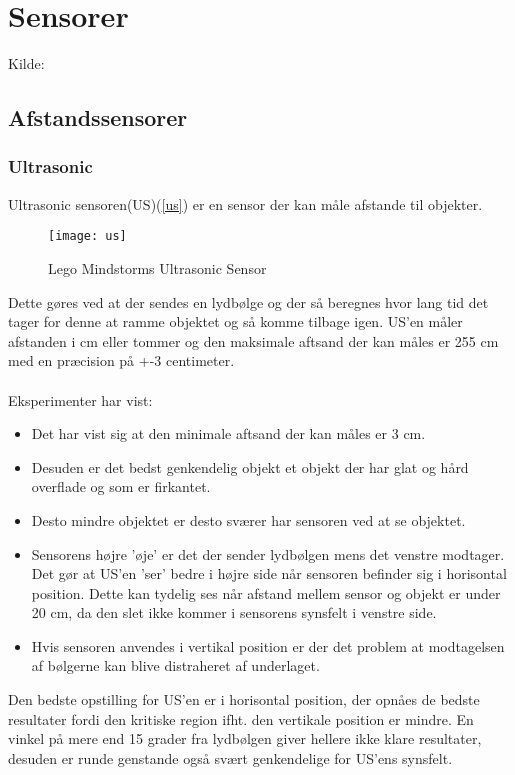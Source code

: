 
\section{Sensorer}
Kilde: \cite{tikNXT}
\subsection{Afstandssensorer}
\subsubsection{Ultrasonic}
Ultrasonic sensoren(US)(\ref{us}) er en sensor der kan måle afstande til objekter.

\begin{figure}[h]
\centering
\texttt{[image: us]}
\caption{Lego Mindstorms Ultrasonic Sensor}
\end{figure}

Dette gøres ved at der sendes en lydbølge og der så beregnes hvor lang tid det tager for denne at ramme objektet og så komme tilbage igen.
US'en måler afstanden i cm eller tommer og den maksimale aftsand der kan måles er 255 cm med en præcision på +-3 centimeter.
\\
\\
Eksperimenter\cite{tikNXT} har vist:
\begin{itemize}
\item Det har vist sig at den minimale aftsand der kan måles er 3 cm.
\item Desuden er det bedst genkendelig objekt et objekt der har glat og hård overflade og som er firkantet.
\item Desto mindre objektet er desto sværer har sensoren ved at se objektet.
\item Sensorens højre 'øje' er det der sender lydbølgen mens det venstre modtager.
Det gør at US'en 'ser' bedre i højre side når sensoren befinder sig i horisontal position.
Dette kan tydelig ses når afstand mellem sensor og objekt er under 20 cm, da den slet ikke kommer i sensorens synsfelt i venstre side.
\item Hvis sensoren anvendes i vertikal position er der det problem at modtagelsen af bølgerne kan blive distraheret af underlaget.
\end{itemize}

Den bedste opstilling for US'en er i horisontal position, der opnåes de bedste resultater fordi den kritiske region ifht. den vertikale position er mindre.
En vinkel på mere end 15 grader fra lydbølgen giver hellere ikke klare resultater, desuden er runde genstande også svært genkendelige for US'ens synsfelt.

